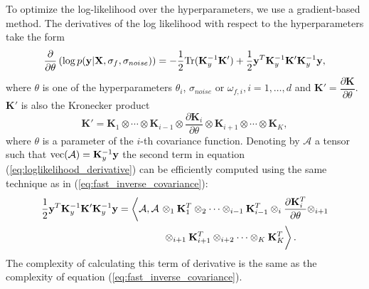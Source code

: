 To optimize the log-likelihood over the hyperparameters, we use a gradient-based method.
The derivatives of the log likelihood with respect to the hyperparameters take the form
\begin{equation}
\label{eq:loglikelihood_derivative}
    \frac{\partial}{\partial \theta} \left (\log \vphantom{p(\mathbf{y} | \mathbf{X}, \sigma_f, \sigma_{noise})}
    p(\mathbf{y} | \mathbf{X}, \sigma_f, \sigma_{noise}) \right ) =
    -\frac12 {\rm Tr}(\mathbf{K}_y^{-1} \mathbf{K}') + \frac12\mathbf{y}^T \mathbf{K}_y^{-1} \mathbf{K}' \mathbf{K}_y^{-1} \mathbf{y},
\end{equation}
where $\theta$ is one of the hyperparameters $\theta_i$, $\sigma_{noise}$ or $\omega_{f, i}, i = 1, \ldots, d$ and
$\mathbf{K}' = \dfrac{\partial \mathbf{K}}{\partial \theta}$.
$\mathbf{K}'$ is also the Kronecker product
\[
\mathbf{K}' = \mathbf{K}_1 \otimes \cdots \otimes \mathbf{K}_{i - 1} \otimes \frac{\partial \mathbf{K}_i}{\partial \theta}
\otimes \mathbf{K}_{i + 1} \otimes \cdots \otimes \mathbf{K}_K,
\]
where $\theta$ is a parameter of the $i$-th covariance function.
Denoting by $\mathcal{A}$ a tensor such that ${\rm vec}(\mathcal{A}) = \mathbf{K}_y^{-1}\mathbf{y}$
the second term in equation (\ref{eq:loglikelihood_derivative}) can be efficiently computed
using the same technique as in (\ref{eq:fast_inverse_covariance}):
\begin{align}
  \label{eq:fast_derivative_second_term}
    \frac12\mathbf{y}^T \mathbf{K}_y^{-1} \mathbf{K}'\mathbf{K}_y^{-1} \mathbf{y} =
    \left < \mathcal{A}, \mathcal{A}
    \vphantom{\frac{\partial \mathbf{K}_i^T}{\partial \theta}}
    \right .
    & \otimes_1 \mathbf{K}_1^T \otimes_2 \cdots \otimes_{i - 1}
    \mathbf{K}_{i - 1}^T \otimes_i
    \frac{\partial \mathbf{K}_i^T}{\partial \theta} \otimes_{i + 1} \nonumber \\
    &\left .
    \vphantom{\frac{\partial \mathbf{K}_i^T}{\partial \theta}}
    \otimes_{i + 1} \mathbf{K}_{i + 1}^T \otimes_{i + 2} \cdots \otimes_K \mathbf{K}_K^T \right >.
\end{align}
The complexity of calculating this term of derivative is the same as the complexity of
equation (\ref{eq:fast_inverse_covariance}).

